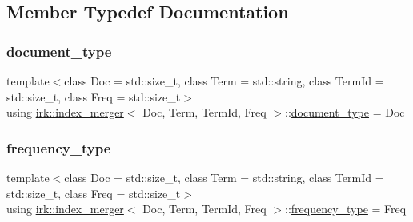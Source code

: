\subsection{Member Typedef Documentation}
\mbox{\label{classirk_1_1index__merger_ace9b689f5d38f6aeed3ce16f0f1bd260}} 
\subsubsection{\texorpdfstring{document\+\_\+type}{document\_type}}
{\footnotesize\ttfamily template$<$class Doc  = std\+::size\+\_\+t, class Term  = std\+::string, class Term\+Id  = std\+::size\+\_\+t, class Freq  = std\+::size\+\_\+t$>$ \\
using \mbox{\hyperlink{classirk_1_1index__merger}{irk\+::index\+\_\+merger}}$<$ Doc, Term, Term\+Id, Freq $>$\+::\mbox{\hyperlink{classirk_1_1index__merger_ace9b689f5d38f6aeed3ce16f0f1bd260}{document\+\_\+type}} =  Doc}

\mbox{\label{classirk_1_1index__merger_a6cb409ab2e737118969206ee9b27d147}} 
\subsubsection{\texorpdfstring{frequency\+\_\+type}{frequency\_type}}
{\footnotesize\ttfamily template$<$class Doc  = std\+::size\+\_\+t, class Term  = std\+::string, class Term\+Id  = std\+::size\+\_\+t, class Freq  = std\+::size\+\_\+t$>$ \\
using \mbox{\hyperlink{classirk_1_1index__merger}{irk\+::index\+\_\+merger}}$<$ Doc, Term, Term\+Id, Freq $>$\+::\mbox{\hyperlink{classirk_1_1index__merger_a6cb409ab2e737118969206ee9b27d147}{frequency\+\_\+type}} =  Freq}

\mbox{\label{classirk_1_1index__merger_ad218976b86b988db7a72b81f67d352b4}} 
